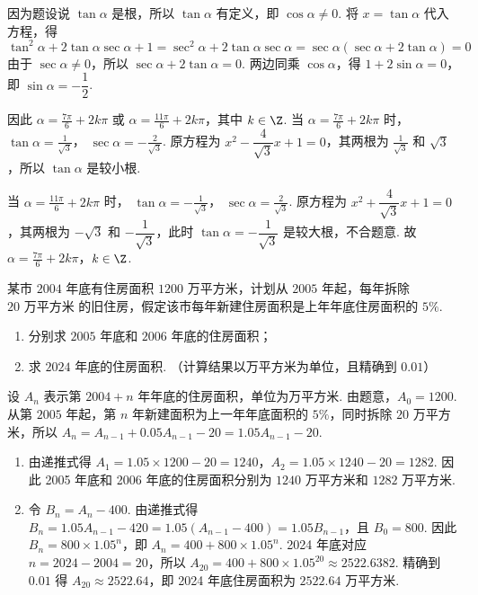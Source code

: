 \begin{solution}
因为题设说 \(\tan\alpha\) 是根，所以 \(\tan\alpha\) 有定义，即 \(\cos\alpha\neq0\). 将 \(x=\tan\alpha\) 代入方程，得
\[
\tan^2\alpha+2\tan\alpha\sec\alpha+1
=\sec^2\alpha+2\tan\alpha\sec\alpha
=\sec\alpha\left(\sec\alpha+2\tan\alpha\right)=0
\]
由于 \(\sec\alpha\neq0\)，所以 \(\sec\alpha+2\tan\alpha=0\). 两边同乘 \(\cos\alpha\)，得
\(1+2\sin\alpha=0\)，即 \(\sin\alpha=-\dfrac12\).

因此
\(\displaystyle\alpha=\frac{7\pi}{6}+2k\pi\) 或
\(\displaystyle\alpha=\frac{11\pi}{6}+2k\pi\)，其中 \(k\in\Z\).
当 \(\displaystyle\alpha=\frac{7\pi}{6}+2k\pi\) 时，
\(\displaystyle\tan\alpha=\frac1{\sqrt3}\)，
\(\displaystyle\sec\alpha=-\frac2{\sqrt3}\). 原方程为
\(x^2-\dfrac4{\sqrt3}x+1=0\)，其两根为
\(\displaystyle\frac1{\sqrt3}\) 和 \(\sqrt3\)，所以 \(\tan\alpha\) 是较小根.

当 \(\displaystyle\alpha=\frac{11\pi}{6}+2k\pi\) 时，
\(\displaystyle\tan\alpha=-\frac1{\sqrt3}\)，
\(\displaystyle\sec\alpha=\frac2{\sqrt3}\). 原方程为
\(x^2+\dfrac4{\sqrt3}x+1=0\)，其两根为
\(-\sqrt3\) 和 \(-\dfrac1{\sqrt3}\)，此时 \(\tan\alpha=-\dfrac1{\sqrt3}\) 是较大根，不合题意. 故
\(\displaystyle\alpha=\frac{7\pi}{6}+2k\pi\)，\(k\in\Z\).
\end{solution}

\begin{problem}
某市 \(2004\) 年底有住房面积 \(1200\text{ 万平方米}\)，计划从 \(2005\) 年起，每年拆除 \(20\text{ 万平方米}\) 的旧住房，假定该市每年新建住房面积是上年年底住房面积的 \(5\%\).

\begin{enumerate}
\item 分别求 \(2005\) 年底和 \(2006\) 年底的住房面积；
\item 求 \(2024\) 年底的住房面积. （计算结果以万平方米为单位，且精确到 \(0.01\)）
\end{enumerate}
\end{problem}

\begin{solution}
设 \(A_n\) 表示第 \(2004+n\) 年年底的住房面积，单位为万平方米. 由题意，\(A_0=1200\). 从第 \(2005\) 年起，第 \(n\) 年新建面积为上一年年底面积的 \(5\%\)，同时拆除 \(20\) 万平方米，所以
\(A_n=A_{n-1}+0.05A_{n-1}-20=1.05A_{n-1}-20\).

\begin{enumerate}
\item 由递推式得 \(A_1=1.05\times1200-20=1240\)，\(A_2=1.05\times1240-20=1282\). 因此 2005 年底和 2006 年底的住房面积分别为 \(1240\) 万平方米和 \(1282\) 万平方米.

\item 令 \(B_n=A_n-400\). 由递推式得
\(B_n=1.05A_{n-1}-420=1.05(A_{n-1}-400)=1.05B_{n-1}\)，且 \(B_0=800\). 因此
\(B_n=800\times1.05^n\)，即
\(A_n=400+800\times1.05^n\).
2024 年底对应 \(n=2024-2004=20\)，所以
\(A_{20}=400+800\times1.05^{20}\approx2522.6382\).
精确到 \(0.01\) 得 \(A_{20}\approx2522.64\)，即 2024 年底住房面积为 \(2522.64\) 万平方米.
\end{enumerate}
\end{solution}

